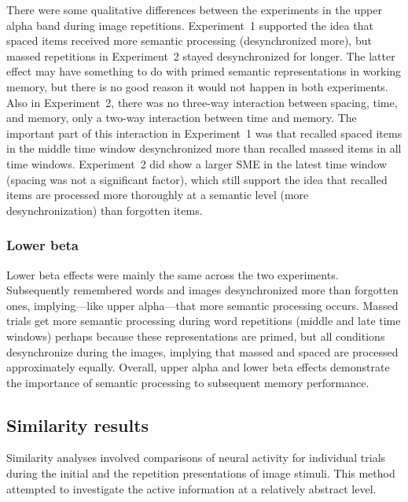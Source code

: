There were some qualitative differences between the experiments in the upper alpha band during image repetitions.  Experiment~1 supported the idea that spaced items received more semantic processing (desynchronized more), but massed repetitions in Experiment~2 stayed desynchronized for longer.  The latter effect may have something to do with primed semantic representations in working memory, but there is no good reason it would not happen in both experiments.  Also in Experiment~2, there was no three-way interaction between spacing, time, and memory, only a two-way interaction between time and memory.  The important part of this interaction in Experiment~1 was that recalled spaced items in the middle time window desynchronized more than recalled massed items in all time windows.  Experiment~2 did show a larger SME in the latest time window (spacing was not a significant factor), which still support the idea that recalled items are processed more thoroughly at a semantic level (more desynchronization) than forgotten items.



\subsubsection{Lower beta}

Lower beta effects were mainly the same across the two experiments.  Subsequently remembered words and images desynchronized more than forgotten ones, implying---like upper alpha---that more semantic processing occurs.
Massed trials get more semantic processing during word repetitions (middle and late time windows) perhaps because these representations are primed, but all conditions desynchronize during the images, implying that massed and spaced are processed approximately equally.  Overall, upper alpha and lower beta effects demonstrate the importance of semantic processing to subsequent memory performance.

\subsection{Similarity results}

Similarity analyses involved comparisons of neural activity for individual trials during the initial and the repetition presentations of image stimuli.  This method attempted to investigate the active information at a relatively abstract level.

